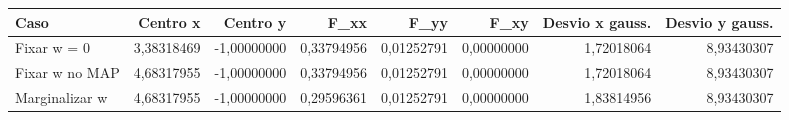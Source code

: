 \begin{tabular}{lrrrrrrr}
\toprule
Caso & Centro x & Centro y & F\_xx & F\_yy & F\_xy & Desvio x gauss. & Desvio y gauss. \\
\midrule
Fixar w = 0 & 3,38318469 & -1,00000000 & 0,33794956 & 0,01252791 & 0,00000000 & 1,72018064 & 8,93430307 \\
Fixar w no MAP & 4,68317955 & -1,00000000 & 0,33794956 & 0,01252791 & 0,00000000 & 1,72018064 & 8,93430307 \\
Marginalizar w & 4,68317955 & -1,00000000 & 0,29596361 & 0,01252791 & 0,00000000 & 1,83814956 & 8,93430307 \\
\bottomrule
\end{tabular}

